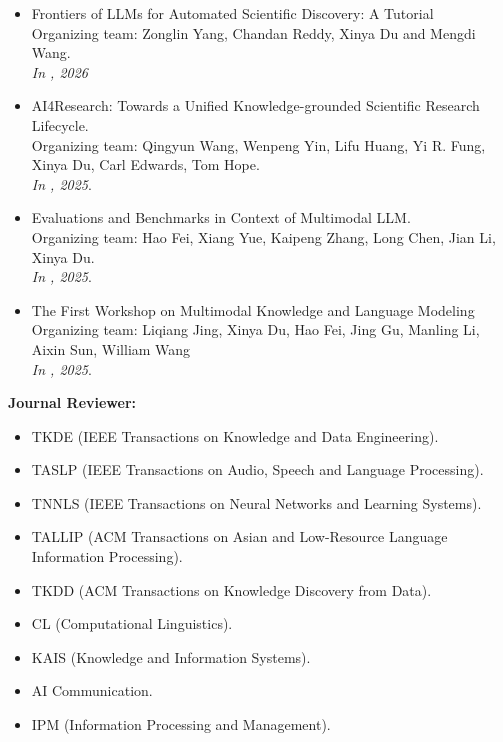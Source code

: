 \begin{itemize}[label={},leftmargin=15pt]
\item Frontiers of LLMs for Automated Scientific Discovery: A Tutorial \\
Organizing team: Zonglin Yang, Chandan Reddy, Xinya Du and Mengdi Wang. \\
{\it In \AAAI, 2026}

\item AI4Research: Towards a Unified Knowledge-grounded Scientific Research Lifecycle. \\
Organizing team: Qingyun Wang, Wenpeng Yin, Lifu Huang, Yi R. Fung, Xinya Du, Carl Edwards, Tom Hope. \\
{\it In \AAAI, 2025}.


\item Evaluations and Benchmarks in Context of Multimodal LLM. \\
Organizing team: Hao Fei, Xiang Yue, Kaipeng Zhang, Long Chen, Jian Li, Xinya Du. \\
{\it In \CVPR, 2025}.

\item The First Workshop on Multimodal Knowledge and Language Modeling \\
Organizing team: Liqiang Jing, Xinya Du, Hao Fei, Jing Gu, Manling Li, Aixin Sun, William Wang \\
{\it In \IJCAI, 2025}.




\end{itemize}


\noindent \textbf{Journal Reviewer:}

\begin{itemize}[label={},leftmargin=15pt]
\item TKDE (IEEE Transactions on Knowledge and Data Engineering).
\item TASLP (IEEE Transactions on Audio, Speech and Language Processing).
\item TNNLS (IEEE Transactions on Neural Networks and Learning Systems).
\item TALLIP (ACM Transactions on Asian and Low-Resource Language Information Processing).
\item TKDD (ACM Transactions on Knowledge Discovery from Data).
\item CL (Computational Linguistics).
\item KAIS (Knowledge and Information Systems).
\item AI Communication.
\item IPM (Information Processing and Management).
\end{itemize}






